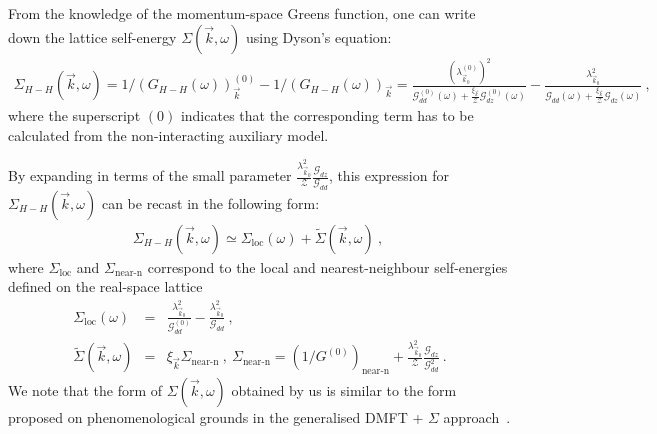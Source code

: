 \documentclass[reprint,hidelinks]{revtex4-2}
\begin{document}
From the knowledge of the momentum-space Greens function, one can write down the lattice self-energy \(\Sigma(\vec k,\omega)\) using Dyson's equation:
\begin{equation}\begin{aligned}
	\label{selfenergy1}
	\Sigma_{H-H}(\vec k,\omega) = 1/\left(G_{H-H}(\omega)\right)_{\vec k}^{(0)} - 1/\left(G_{H-H}(\omega)\right)_{\vec k} = \frac{\left(\lambda_{\vec k_0}^{(0)}\right)^2}{\mathcal{G}^{(0)}_{dd}(\omega) + \frac{\xi_{\vec k}}{\mathcal{Z}}\mathcal{G}^{(0)}_{dz}(\omega)} - \frac{\lambda_{\vec k_0}^2}{\mathcal{G}_{dd}(\omega) + \frac{\xi_{\vec k}}{\mathcal{Z}}\mathcal{G}_{dz}(\omega)}~,
\end{aligned}\end{equation}
where the superscript \((0)\) indicates that the corresponding term has to be calculated from the non-interacting auxiliary model. 

By expanding in terms of the small parameter $\frac{\lambda_{\vec k_0}^2}{\mathcal{Z}}\frac{\mathcal{G}_{dz}}{\mathcal{G}_{dd}}$, this expression for $\Sigma_{H-H}(\vec k,\omega)$ can be recast in the following form:
\begin{equation}\begin{aligned}
	\Sigma_{H-H}(\vec k, \omega) \simeq \Sigma_\text{loc}(\omega) + \tilde{\Sigma}(\vec k, \omega)~,~\label{selfenergy2}
\end{aligned}\end{equation}
where $\Sigma_\text{loc}$ and $\Sigma_\text{near-n}$ correspond to the local and nearest-neighbour self-energies defined on the real-space lattice 
\begin{eqnarray}
\Sigma_\text{loc}(\omega) &=& \frac{\lambda_{\vec k_0}^2}{\mathcal{G}_{dd}^{(0)}} - \frac{\lambda_{\vec k_0}^2}{\mathcal{G}_{dd}}~,\\ 
\tilde{\Sigma}(\vec k, \omega)&=&\xi_{\vec k}\Sigma_\text{near-n}~,~\Sigma_\text{near-n} = \left(1/G^{(0)}\right)_\text{near-n} + \frac{\lambda_{\vec k_0}^2}{\mathcal{Z}}\frac{\mathcal{G}_{dz}}{\mathcal{G}_{dd}^2}~.
\end{eqnarray}
We note that the form of $\Sigma(\vec k, \omega)$ obtained by us is similar to the form proposed on phenomenological grounds in the generalised DMFT + $\Sigma$ approach~\cite{sadovskii2012}.
\end{document}
